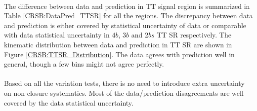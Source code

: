 \paragraph{}
The difference between data and prediction in TT signal region is summarized in Table \ref{CRSB:DataPred_TTSR} for all the regions. 
The discrepancy between data and prediction is either covered by statistical uncertainty of data or comparable with data statistical uncertainty in $4b$, $3b$ and $2bs$ TT SR respectively. 
The kinematic distribution between data and prediction in TT SR are shown in Figure \ref{CRSB:TTSR_Distribution}. 
The data agrees with prediction well in general, though a few bins might not agree perfectly. 

\paragraph{}
Based on all the variation tests, there is no need to introduce extra uncertainty on non-closure systematics. 
Most of the data/prediction disagreements are well covered by the data statistical uncertainty.

% 

% 

% 

